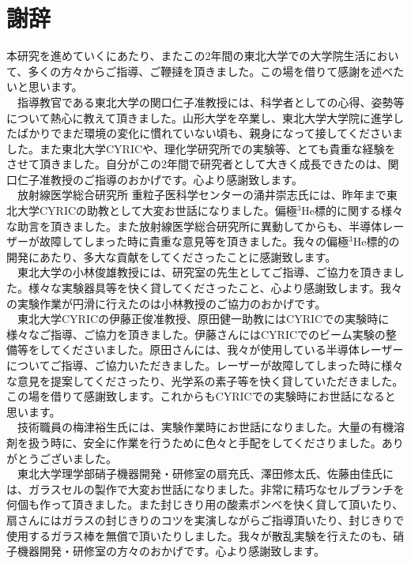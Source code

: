\documentclass[12pt,a4j,openany,report]{jsbook}
\begin{document}

 \chapter*{謝辞}

本研究を進めていくにあたり、またこの2年間の東北大学での大学院生活において、多くの方々からご指導、ご鞭撻を頂きました。この場を借りて感謝を述べたいと思います。\\
　指導教官である東北大学の関口仁子准教授には、科学者としての心得、姿勢等について熱心に教えて頂きました。山形大学を卒業し、東北大学大学院に進学したばかりでまだ環境の変化に慣れていない頃も、親身になって接してくださいました。また東北大学CYRICや、理化学研究所での実験等、とても貴重な経験をさせて頂きました。自分がこの2年間で研究者として大きく成長できたのは、関口仁子准教授のご指導のおかげです。心より感謝致します。\\
　放射線医学総合研究所 重粒子医科学センターの涌井崇志氏には、昨年まで東北大学CYRICの助教として大変お世話になりました。偏極$^3$He標的に関する様々な助言を頂きました。また放射線医学総合研究所に異動してからも、半導体レーザーが故障してしまった時に貴重な意見等を頂きました。我々の偏極$^3$He標的の開発にあたり、多大な貢献をしてくださったことに感謝致します。\\
　東北大学の小林俊雄教授には、研究室の先生としてご指導、ご協力を頂きました。様々な実験器具等を快く貸してくださったこと、心より感謝致します。我々の実験作業が円滑に行えたのは小林教授のご協力のおかげです。\\
　東北大学CYRICの伊藤正俊准教授、原田健一助教にはCYRICでの実験時に様々なご指導、ご協力を頂きました。伊藤さんにはCYRICでのビーム実験の整備等をしてくださいました。原田さんには、我々が使用している半導体レーザーについてご指導、ご協力いただきました。レーザーが故障してしまった時に様々な意見を提案してくださったり、光学系の素子等を快く貸していただきました。この場を借りて感謝致します。これからもCYRICでの実験時にお世話になると思います。\\
　技術職員の梅津裕生氏には、実験作業時にお世話になりました。大量の有機溶剤を扱う時に、安全に作業を行うために色々と手配をしてくださりました。ありがとうございました。\\
　東北大学理学部硝子機器開発・研修室の扇充氏、澤田修太氏、佐藤由佳氏には、ガラスセルの製作で大変お世話になりました。非常に精巧なセルブランチを何個も作って頂きました。また封じきり用の酸素ボンベを快く貸して頂いたり、扇さんにはガラスの封じきりのコツを実演しながらご指導頂いたり、封じきりで使用するガラス棒を無償で頂いたりしました。我々が散乱実験を行えたのも、硝子機器開発・研修室の方々のおかげです。心より感謝致します。\\
\end{document}
